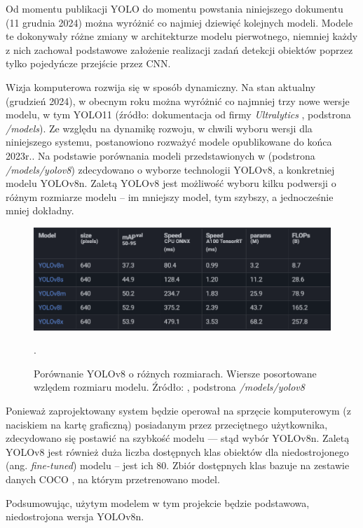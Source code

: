 Od momentu publikacji YOLO do momentu powstania niniejszego dokumentu (11 grudnia 2024) można wyróżnić co najmiej dziewięć kolejnych modeli. Modele te dokonywały różne zmiany w architekturze modelu pierwotnego, niemniej każdy z nich zachował podstawowe założenie realizacji zadań detekcji obiektów poprzez tylko pojedyńcze przejście przez CNN. 

Wizja komputerowa rozwija się w sposób dynamiczny. Na stan aktualny (grudzień 2024), w obecnym roku można wyróżnić co najmniej trzy nowe wersje modelu, w tym YOLO11 \cite{yolo11_ultralytics} (źródło: dokumentacja od firmy \emph{Ultralytics} \cite{yolo_docs}, podstrona \emph{/models}).
Ze względu na dynamikę rozwoju, w chwili wyboru wersji dla niniejszego systemu, postanowiono rozważyć modele opublikowane do końca 2023r.. Na podstawie porównania modeli przedstawionych w \cite{yolo_docs} (podstrona \emph{/models/yolov8}) zdecydowano o wyborze technologii YOLOv8, a konkretniej modelu YOLOv8n. Zaletą YOLOv8 jest możliwość wyboru kilku podwersji o różnym rozmiarze modelu -- im mniejszy model, tym szybszy, a jednocześnie mniej dokładny.

\begin{figure}[H]
    \centering
    \includegraphics[width=\linewidth]{r_technologie/AI_assets/yolo8_sizes.png}
    \caption{Porównanie YOLOv8 o różnych rozmiarach. Wiersze posortowane wzlędem rozmiaru modelu. Źródło: \cite{yolo_docs}, podstrona \emph{/models/yolov8}}.
    \label{fig:yolo8-sizes}
\end{figure}

Ponieważ zaprojektowany system będzie operował na sprzęcie komputerowym (z naciskiem na kartę graficzną) posiadanym przez przeciętnego użytkownika, zdecydowano się postawić na szybkość modelu --- stąd wybór YOLOv8n. Zaletą YOLOv8 jest również duża liczba dostępnych klas obiektów dla niedostrojonego (ang. \emph{fine-tuned}) modelu -- jest ich 80. Zbiór dostępnych klas bazuje na zestawie danych COCO \cite{COCO_docs}, na którym przetrenowano model.

Podsumowując, użytym modelem w tym projekcie będzie podstawowa, niedostrojona wersja YOLOv8n. 



